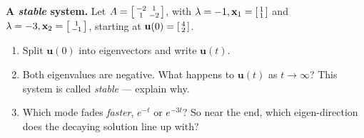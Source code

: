 \documentclass[10pt]{article}
\newcommand{\uu}{\mathbf{u}}
\newcommand{\xx}{\mathbf{x}}
\begin{document}
\begin{tcolorbox}[colback=white, colframe=black!40, title=\textbf{Tier E --- Extension},
    fonttitle=\bfseries, arc=1.5mm, left=3mm, right=3mm, top=2mm, bottom=2mm, breakable]
\textbf{A \emph{stable} system.} Let $A=\begin{bsmallmatrix} -2 & 1\\ 1 & -2 \end{bsmallmatrix}$, with
$\lambda=-1,\xx_1=\begin{bsmallmatrix}1\\1\end{bsmallmatrix}$ and $\lambda=-3,\xx_2=\begin{bsmallmatrix}1\\-1\end{bsmallmatrix}$, starting at $\uu(0)=\begin{bsmallmatrix}4\\2\end{bsmallmatrix}$.
\begin{enumerate}[leftmargin=1.7em, itemsep=9pt]
  \item Split $\uu(0)$ into eigenvectors and write $\uu(t)$. 
  \item Both eigenvalues are negative. What happens to $\uu(t)$ as $t\to\infty$? This system is called \emph{stable} --- explain why. \writeline
  \item Which mode fades \emph{faster}, $e^{-t}$ or $e^{-3t}$? So near the end, which eigen-direction does the decaying solution line up with? \writeline
\end{enumerate}
\end{tcolorbox}
\end{document}
